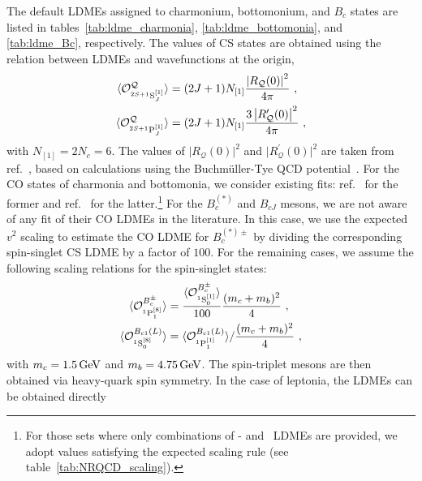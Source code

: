 The default LDMEs assigned to charmonium, bottomonium, and $B_c$ states are listed in tables~\ref{tab:ldme_charmonia}, \ref{tab:ldme_bottomonia}, and \ref{tab:ldme_Bc}, respectively.
The values of CS states are obtained using the relation between LDMEs and wavefunctions at the origin,
\begin{align}
    \langle \mathcal O_{^{2S+1}\mathrm{S}_J^{[1]}}^{\mathcal Q} \rangle & = (2J+1)N_{[1]}\frac{\left|R_\mathcal{Q}(0)\right|^2}{4\pi}\ ,\\
    \langle \mathcal O_{^{2S+1}\mathrm{P}_J^{[1]}}^{\mathcal Q} \rangle & = (2J+1)N_{[1]}\frac{3\left|R^{\prime}_\mathcal{Q}(0)\right|^2}{4\pi}\ ,
\label{eq:ldme_cs}
\end{align}
with $N_{[1]} = 2N_c = 6$. The values of $\vert R_\mathcal{Q}(0)\vert^2$ and $\vert R_\mathcal{Q}^\prime(0)\vert^2$ are taken from ref.~\cite{Eichten:1995ch}, based on calculations using the Buchmüller-Tye QCD potential~\cite{Buchmuller:1980su}.
For the CO states of charmonia and bottomonia, we consider existing fits: ref.~\cite{Han:2014jya} for the former and ref.~\cite{Han:2014kxa} for the latter.\footnote{For those sets where only combinations of \pwave- and \swavetxt\ LDMEs are provided, we adopt values satisfying the expected scaling rule (see table~\ref{tab:NRQCD_scaling}).}
For the $B_c^{(*)}$ and $B_{cJ}$ mesons, we are not aware of any fit of their CO LDMEs in the literature. In this case, we use the expected $v^2$ scaling to estimate the CO {\swavetxt} LDME for $B_c^{(*)\pm}$ by dividing the corresponding spin-singlet CS LDME by a factor of $100$. For the remaining cases, we assume the following scaling relations for the spin-singlet states:
\begin{align}
    \langle\mathcal{O}_{^{1}\pwave_1^{[8]}}^{B_c^\pm}\rangle & = \dfrac{\langle\mathcal{O}_{^{1}\swave_0^{[1]}}^{B_c^\pm}\rangle}{100}\dfrac{(m_c+m_b)^2}{4}\ ,\\
    \langle\mathcal{O}_{^{1}\swave_0^{[8]}}^{B_{c1}(L)}\rangle & = \langle\mathcal{O}_{^{1}\pwave_1^{[1]}}^{B_{c1}(L)}\rangle/\dfrac{(m_c+m_b)^2}{4}\ ,
\label{eq:ldme_co_cb}
\end{align}
with $m_c = 1.5\,{\rm GeV}$ and $m_b = 4.75\,{\rm GeV}$. The spin-triplet mesons are then obtained via heavy-quark spin symmetry.
In the case of leptonia, the LDMEs can be obtained directly
